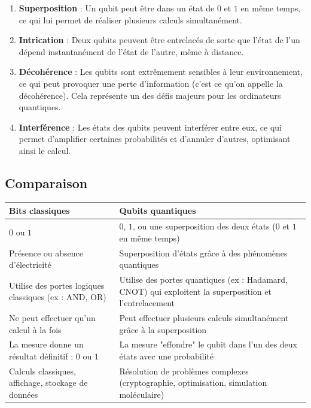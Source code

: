 \documentclass{article}
\begin{document}
\begin{enumerate}
    \item \textbf{Superposition} : Un qubit peut être dans un état de $0$ et $1$ en même temps, ce qui lui permet de réaliser plusieurs calculs simultanément.
    \item \textbf{Intrication} : Deux qubits peuvent être entrelacés de sorte que l'état de l'un dépend instantanément de l'état de l'autre, même à distance.
    \item \textbf{Décohérence} : Les qubits sont extrêmement sensibles à leur environnement, ce qui peut provoquer une perte d'information (c'est ce qu'on appelle la décohérence). Cela représente un des défis majeurs pour les ordinateurs quantiques.
    \item \textbf{Interférence} : Les états des qubits peuvent interférer entre eux, ce qui permet d’amplifier certaines probabilités et d’annuler d'autres, optimisant ainsi le calcul.
\end{enumerate}
\medskip
\subsection{Comparaison}

\begin{tabular}{|l|p{7cm}|}  %
  \hline
  \textbf{Bits classiques} & \textbf{Qubits quantiques} \\
  \hline
  $0$ ou $1$ & $0$, $1$, ou une superposition des deux états ($0$ et $1$ en même temps) \\
  \hline
  Présence ou absence d’électricité & Superposition d'états grâce à des phénomènes quantiques \\
  \hline
  Utilise des portes logiques classiques (ex : AND, OR) & Utilise des portes quantiques (ex : Hadamard, CNOT) qui exploitent la superposition et l'entrelacement \\
  \hline
  Ne peut effectuer qu'un calcul à la fois & Peut effectuer plusieurs calculs simultanément grâce à la superposition \\
  \hline
  La mesure donne un résultat définitif : $0$ ou $1$ & La mesure "effondre" le qubit dans l'un des deux états avec une probabilité \\
  \hline
  Calculs classiques, affichage, stockage de données & Résolution de problèmes complexes (cryptographie, optimisation, simulation moléculaire) \\
  \hline
\end{tabular}
\end{document}
